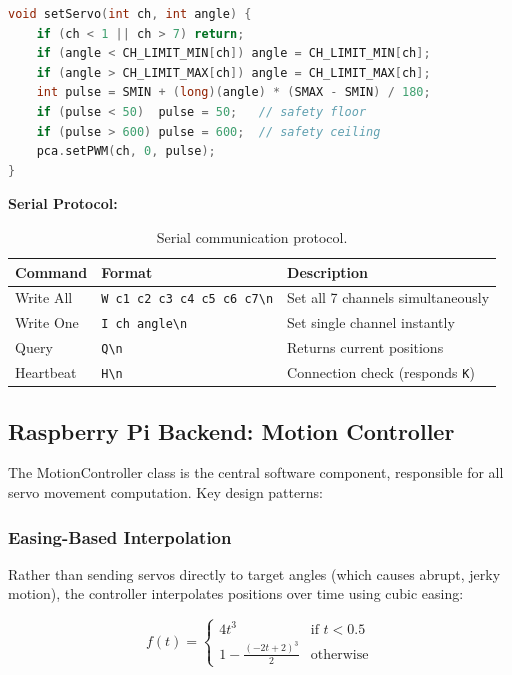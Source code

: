 \documentclass[12pt,a4paper]{article}
\begin{document}
\begin{lstlisting}[language=C++, caption=Core servo control function (bridge.ino)]
void setServo(int ch, int angle) {
    if (ch < 1 || ch > 7) return;
    if (angle < CH_LIMIT_MIN[ch]) angle = CH_LIMIT_MIN[ch];
    if (angle > CH_LIMIT_MAX[ch]) angle = CH_LIMIT_MAX[ch];
    int pulse = SMIN + (long)(angle) * (SMAX - SMIN) / 180;
    if (pulse < 50)  pulse = 50;   // safety floor
    if (pulse > 600) pulse = 600;  // safety ceiling
    pca.setPWM(ch, 0, pulse);
}
\end{lstlisting}

\textbf{Serial Protocol:}

\begin{table}[H]
\centering
\caption{Serial communication protocol.}
\begin{tabular}{llp{7cm}}
\toprule
\textbf{Command} & \textbf{Format} & \textbf{Description} \\
\midrule
Write All & \texttt{W c1 c2 c3 c4 c5 c6 c7\textbackslash n} & Set all 7 channels simultaneously \\
Write One & \texttt{I ch angle\textbackslash n} & Set single channel instantly \\
Query & \texttt{Q\textbackslash n} & Returns current positions \\
Heartbeat & \texttt{H\textbackslash n} & Connection check (responds \texttt{K}) \\
\bottomrule
\end{tabular}
\end{table}

\subsection{Raspberry Pi Backend: Motion Controller}

The MotionController class is the central software component, responsible for all servo movement computation. Key design patterns:

\subsubsection{Easing-Based Interpolation}

Rather than sending servos directly to target angles (which causes abrupt, jerky motion), the controller interpolates positions over time using cubic easing:

\begin{equation}
f(t) = \begin{cases}
4t^3 & \text{if } t < 0.5 \\
1 - \frac{(-2t + 2)^3}{2} & \text{otherwise}
\end{cases}
\label{eq:easing}
\end{equation}
\end{document}
